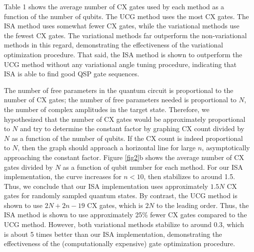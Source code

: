 Table 1 shows the average number of CX gates used by each method as a function of the 
number of qubits. The UCG method uses the most CX gates. The ISA method uses somewhat 
fewer CX gates, while the variational methods use the fewest CX gates. The 
variational methods far outperform the non-variational methods in this regard, 
demonstrating the effectiveness of the variational optimization procedure. That said, 
the ISA method is shown to outperform the UCG method without any variational angle 
tuning procedure, indicating that ISA is able to find good QSP gate sequences.

The number of free parameters in the quantum circuit is proportional to the number of 
CX gates; the number of free parameters needed is proportional to $N$, the number of 
complex amplitudes in the target state. Therefore, we hypothesized that the number of 
CX gates would be approximately proportional to $N$ and try to determine the constant 
factor by graphing CX count divided by $N$ as a function of the number of qubits. If 
the CX count is indeed proportional to $N$, then the graph should approach a
horizontal line for large $n$, asymptotically approaching the constant factor. 
Figure \ref{fig2}b shows the average number of CX gates divided by $N$ as a function of 
qubit number for each method. For our ISA implementation, the curve increases for 
$n < 10$, then stabilizes to around 1.5. Thus, we conclude that our ISA 
implementation uses approximately $1.5N$ CX gates for randomly sampled quantum states.
By contrast, the UCG method is shown to use $2N + 2n - 19$ CX gates, which is $2N$ to
the leading order. Thus, the ISA method is shown to use approximately 25\% fewer CX gates
compared to the UCG method. However, both variational methods stabilize to around
0.3, which is about 5 times better than our ISA implementation, demonstrating the
effectiveness of the (computationally expensive) gate optimization procedure.


